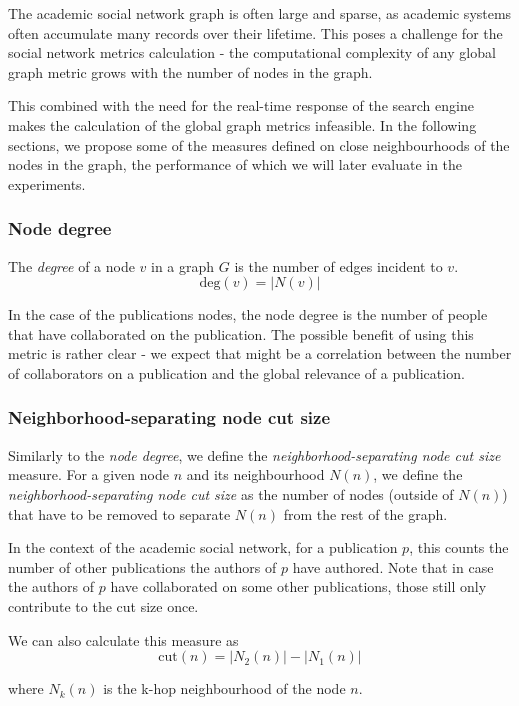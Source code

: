 The academic social network graph is often large and sparse, as academic systems often accumulate many records over their lifetime.
This poses a challenge for the social network metrics calculation - the computational complexity of any global graph metric grows 
with the number of nodes in the graph.

This combined with the need for the real-time response of the search engine makes the calculation of the global graph metrics infeasible.
In the following sections, we propose some of the measures defined on close neighbourhoods of the nodes in the graph,
the performance of which we will later evaluate in the experiments.

\subsubsection{Node degree}

The \textit{degree} of a node $v$ in a graph $G$ is the number of edges incident to $v$.
$$
\text{deg}(v) = |N(v)|
$$

In the case of the publications nodes, the node degree is the number of people that have collaborated on the publication.
The possible benefit of using this metric is rather clear - we expect that might be a correlation between the number of collaborators on a publication and the 
global relevance of a publication.

\subsubsection{Neighborhood-separating node cut size}

Similarly to the \textit{node degree}, we define the \textit{neighborhood-separating node cut size} measure.
For a given node $n$ and its neighbourhood $N(n)$, we define the \textit{neighborhood-separating node cut size} 
as the number of nodes (outside of $N(n)$) that have to be removed to separate $N(n)$ from the rest of the graph.

In the context of the academic social network, for a publication $p$, this counts the number of other publications the authors of $p$ have authored.
Note that in case the authors of $p$ have collaborated on some other publications, those still only contribute to the cut size once.

We can also calculate this measure as 
$$
\text{cut}(n) = \lvert N_2(n) \rvert - \lvert N_1(n) \rvert
$$

where $N_k(n)$ is the k-hop neighbourhood of the node $n$.

